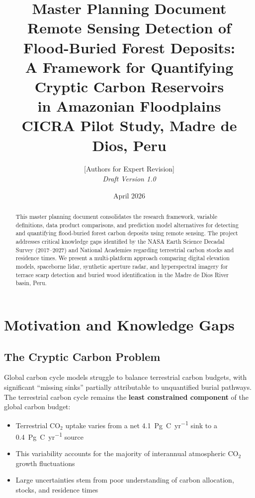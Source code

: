 \documentclass[11pt,letterpaper]{article}
\title{%
\textbf{Master Planning Document}\\[0.5em]
\Large Remote Sensing Detection of Flood-Buried Forest Deposits:\\
A Framework for Quantifying Cryptic Carbon Reservoirs\\
in Amazonian Floodplains\\[1em]
\large CICRA Pilot Study, Madre de Dios, Peru
}
\author{%
[Authors for Expert Revision]\\
\textit{Draft Version 1.0}
}
\date{April 2026}
\begin{document}
\maketitle

\begin{abstract}
This master planning document consolidates the research framework, variable definitions, data product comparisons, and prediction model alternatives for detecting and quantifying flood-buried forest carbon deposits using remote sensing. The project addresses critical knowledge gaps identified by the NASA Earth Science Decadal Survey (2017--2027) and National Academies regarding terrestrial carbon stocks and residence times. We present a multi-platform approach comparing digital elevation models, spaceborne lidar, synthetic aperture radar, and hyperspectral imagery for terrace scarp detection and buried wood identification in the Madre de Dios River basin, Peru.
\end{abstract}

\tableofcontents
\newpage

\section{Motivation and Knowledge Gaps}
\label{sec:motivation}

\subsection{The Cryptic Carbon Problem}

Global carbon cycle models struggle to balance terrestrial carbon budgets, with significant ``missing sinks'' partially attributable to unquantified burial pathways. The terrestrial carbon cycle remains the \textbf{least constrained component} of the global carbon budget:

\begin{itemize}[noitemsep]
    \item Terrestrial CO$_2$ uptake varies from a net \SI{4.1}{Pg~C~yr^{-1}} sink to a \SI{0.4}{Pg~C~yr^{-1}} source
    \item This variability accounts for the majority of interannual atmospheric CO$_2$ growth fluctuations
    \item Large uncertainties stem from poor understanding of carbon allocation, stocks, and residence times
\end{itemize}
\end{document}
